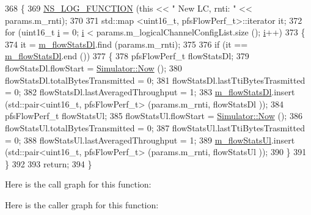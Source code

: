 \begin{DoxyCode}
368 \{
369   \hyperlink{log-macros-disabled_8h_a90b90d5bad1f39cb1b64923ea94c0761}{NS\_LOG\_FUNCTION} (\textcolor{keyword}{this} << \textcolor{stringliteral}{" New LC, rnti: "}  << params.m\_rnti);
370 
371   std::map <uint16\_t, pfsFlowPerf\_t>::iterator it;
372   \textcolor{keywordflow}{for} (uint16\_t \hyperlink{bernuolliDistribution_8m_a6f6ccfcf58b31cb6412107d9d5281426}{i} = 0; \hyperlink{bernuolliDistribution_8m_a6f6ccfcf58b31cb6412107d9d5281426}{i} < params.m\_logicalChannelConfigList.size (); \hyperlink{bernuolliDistribution_8m_a6f6ccfcf58b31cb6412107d9d5281426}{i}++)
373     \{
374       it = \hyperlink{classns3_1_1PfFfMacScheduler_a00b148349167b85ab9170570e2530b92}{m\_flowStatsDl}.find (params.m\_rnti);
375 
376       \textcolor{keywordflow}{if} (it == \hyperlink{classns3_1_1PfFfMacScheduler_a00b148349167b85ab9170570e2530b92}{m\_flowStatsDl}.end ())
377         \{
378           pfsFlowPerf\_t flowStatsDl;
379           flowStatsDl.flowStart = \hyperlink{classns3_1_1Simulator_ac3178fa975b419f7875e7105be122800}{Simulator::Now} ();
380           flowStatsDl.totalBytesTransmitted = 0;
381           flowStatsDl.lastTtiBytesTrasmitted = 0;
382           flowStatsDl.lastAveragedThroughput = 1;
383           \hyperlink{classns3_1_1PfFfMacScheduler_a00b148349167b85ab9170570e2530b92}{m\_flowStatsDl}.insert (std::pair<uint16\_t, pfsFlowPerf\_t> (params.m\_rnti, flowStatsDl
      ));
384           pfsFlowPerf\_t flowStatsUl;
385           flowStatsUl.flowStart = \hyperlink{classns3_1_1Simulator_ac3178fa975b419f7875e7105be122800}{Simulator::Now} ();
386           flowStatsUl.totalBytesTransmitted = 0;
387           flowStatsUl.lastTtiBytesTrasmitted = 0;
388           flowStatsUl.lastAveragedThroughput = 1;
389           \hyperlink{classns3_1_1PfFfMacScheduler_a1c3919a5dcda7ca29e667e2bca774ca5}{m\_flowStatsUl}.insert (std::pair<uint16\_t, pfsFlowPerf\_t> (params.m\_rnti, flowStatsUl
      ));
390         \}
391     \}
392 
393   \textcolor{keywordflow}{return};
394 \}
\end{DoxyCode}


Here is the call graph for this function\+:




Here is the caller graph for this function\+:



